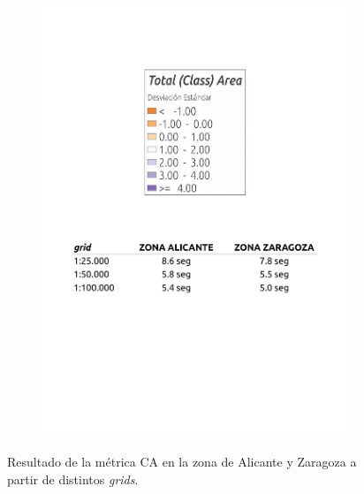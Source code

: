 \begin{figure}
\begin{subfigure}[b]{0.4\textwidth}
    \includegraphics[width=\textwidth]{ResultadosyDiscusion/Figs/Results/leyenda2.pdf}
    \label{fig:leyenda2}
  \end{subfigure}
  
  \caption{Resultado de la métrica CA en la zona de Alicante y Zaragoza a partir de distintos \textit{grids}.}
  \label{fig:c_area}
  \end{figure}








